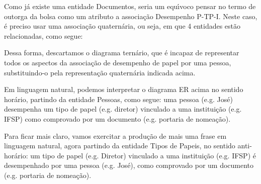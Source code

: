 \documentclass[
12pt,		%
openright,	%
twoside,  %
a4paper,			%
chapter=TITLE,		%
english,			%
french,				%
spanish,			%
brazil				%
]{USPSC-classe/USPSC}
\begin{document}
Como j\'a existe uma entidade \textquotedbl Documentos\textquotedbl , seria um equ\'{\i}voco pensar no termo de outorga da bolsa como um atributo a associa\c{c}\~ao \textquotedbl Desempenho P-TP-I\textquotedbl . Neste caso, \'e preciso usar uma associa\c{c}\~ao quatern\'aria, ou seja, em que 4 entidades est\~ao relacionadas, como segue:











Dessa forma, descartamos o diagrama tern\'ario, que \'e incapaz de representar todos os aspectos da associa\c{c}\~ao de desempenho de papel por uma pessoa, substituindo-o pela representa\c{c}\~ao quatern\'aria indicada acima.









Em linguagem natural, podemos interpretar o diagrama ER acima no sentido hor\'ario, partindo da entidade \textquotedbl Pessoas\textquotedbl , como segue: uma pessoa (e.g. Jos\'e) desempenha um tipo de papel (e.g. diretor) vinculado a uma institui\c{c}\~ao (e.g. IFSP) como comprovado por um documento (e.g. portaria de nomea\c{c}\~ao).









Para ficar mais claro, vamos exercitar a produ\c{c}\~ao de mais uma frase em linguagem natural, agora partindo da entidade \textquotedbl Tipos de Papeis\textquotedbl , no sentido anti-hor\'ario: um tipo de papel (e.g. Diretor) vinculado a uma institui\c{c}\~ao (e.g. IFSP) \'e desempenhado por uma pessoa (e.g. Jos\'e), como comprovado por um documento (e.g. portaria de nomea\c{c}\~ao).
\end{document}
